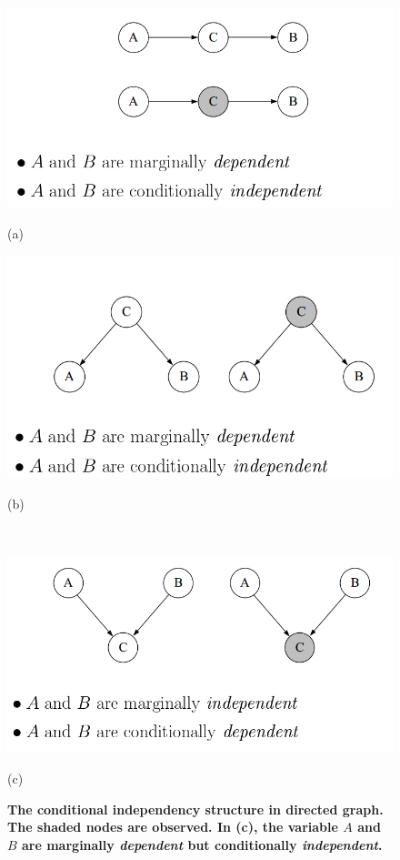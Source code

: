 \documentclass[11pt]{article}
\begin{document}
\begin{figure}
\begin{minipage}[t]{0.5\linewidth}
  \centering
  \centerline{\includegraphics[scale = 0.32]{cond_indep_1.png}}
  \vspace{-5pt}
  \centerline{(a)}
\end{minipage}
\begin{minipage}[t]{0.5\linewidth}
  \centering
  \centerline{\includegraphics[scale = 0.3]{cond_indep_2.png}}
  \vspace{-5pt}
  \centerline{(b)}
\end{minipage}\\
\begin{minipage}[t]{0.5\linewidth}
  \centering
  \centerline{\includegraphics[scale = 0.35]{cond_indep_3.png}}
  \vspace{-5pt}
  \centerline{(c)}
\end{minipage}
\caption{\footnotesize{\textbf{The conditional independency structure in directed graph. The shaded nodes are observed. In (c), the variable $A$ and $B$ are marginally \emph{dependent} but conditionally \emph{independent}. }}}
\label{fig: cond_indep}
\end{figure}
\end{document}
